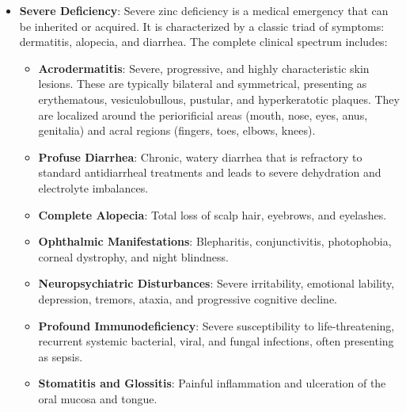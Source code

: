 \begin{itemize}
\begin{itemize}
        \item Night blindness (nyctalopia) due to the role of zinc in the transport and metabolism of vitamin A in the retina.
    \end{itemize}
    \item \textbf{Severe Deficiency}: Severe zinc deficiency is a medical emergency that can be inherited or acquired. It is characterized by a classic triad of symptoms: dermatitis, alopecia, and diarrhea. The complete clinical spectrum includes:
    \begin{itemize}
        \item \textbf{Acrodermatitis}: Severe, progressive, and highly characteristic skin lesions. These are typically bilateral and symmetrical, presenting as erythematous, vesiculobullous, pustular, and hyperkeratotic plaques. They are localized around the periorificial areas (mouth, nose, eyes, anus, genitalia) and acral regions (fingers, toes, elbows, knees).
        \item \textbf{Profuse Diarrhea}: Chronic, watery diarrhea that is refractory to standard antidiarrheal treatments and leads to severe dehydration and electrolyte imbalances.
        \item \textbf{Complete Alopecia}: Total loss of scalp hair, eyebrows, and eyelashes.
        \item \textbf{Ophthalmic Manifestations}: Blepharitis, conjunctivitis, photophobia, corneal dystrophy, and night blindness.
        \item \textbf{Neuropsychiatric Disturbances}: Severe irritability, emotional lability, depression, tremors, ataxia, and progressive cognitive decline.
        \item \textbf{Profound Immunodeficiency}: Severe susceptibility to life-threatening, recurrent systemic bacterial, viral, and fungal infections, often presenting as sepsis.
        \item \textbf{Stomatitis and Glossitis}: Painful inflammation and ulceration of the oral mucosa and tongue.
    \end{itemize}
\end{itemize}

